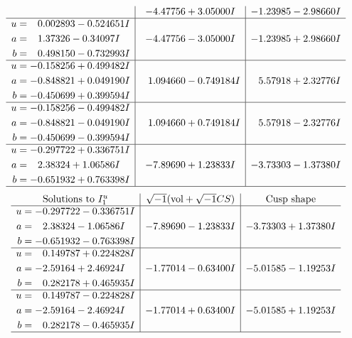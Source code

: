 \documentclass[1p]{elsarticle_modified}
\theoremstyle{definition}
\newcommand{\I}{\sqrt{-1}}
\begin{document}
$$\begin{array}{c|c|c}
 & -4.47756 + 3.05000 I & -1.23985 - 2.98660 I \\ \hline\begin{aligned}
u &= \phantom{-}0.002893 - 0.524651 I \\
a &= \phantom{-}1.37326 - 0.34097 I \\
b &= \phantom{-}0.498150 - 0.732993 I\end{aligned}
 & -4.47756 - 3.05000 I & -1.23985 + 2.98660 I \\ \hline\begin{aligned}
u &= -0.158256 + 0.499482 I \\
a &= -0.848821 + 0.049190 I \\
b &= -0.450699 + 0.399594 I\end{aligned}
 & \phantom{-}1.094660 - 0.749184 I & \phantom{-}5.57918 + 2.32776 I \\ \hline\begin{aligned}
u &= -0.158256 - 0.499482 I \\
a &= -0.848821 - 0.049190 I \\
b &= -0.450699 - 0.399594 I\end{aligned}
 & \phantom{-}1.094660 + 0.749184 I & \phantom{-}5.57918 - 2.32776 I \\ \hline\begin{aligned}
u &= -0.297722 + 0.336751 I \\
a &= \phantom{-}2.38324 + 1.06586 I \\
b &= -0.651932 + 0.763398 I\end{aligned}
 & -7.89690 + 1.23833 I & -3.73303 - 1.37380 I\\
 \hline 
 \end{array}$$\newpage$$\begin{array}{c|c|c}  
\text{Solutions to }I^u_{1}& \I (\text{vol} + \sqrt{-1}CS) & \text{Cusp shape}\\
 \hline 
\begin{aligned}
u &= -0.297722 - 0.336751 I \\
a &= \phantom{-}2.38324 - 1.06586 I \\
b &= -0.651932 - 0.763398 I\end{aligned}
 & -7.89690 - 1.23833 I & -3.73303 + 1.37380 I \\ \hline\begin{aligned}
u &= \phantom{-}0.149787 + 0.224828 I \\
a &= -2.59164 + 2.46924 I \\
b &= \phantom{-}0.282178 + 0.465935 I\end{aligned}
 & -1.77014 - 0.63400 I & -5.01585 - 1.19253 I \\ \hline\begin{aligned}
u &= \phantom{-}0.149787 - 0.224828 I \\
a &= -2.59164 - 2.46924 I \\
b &= \phantom{-}0.282178 - 0.465935 I\end{aligned}
 & -1.77014 + 0.63400 I & -5.01585 + 1.19253 I\\
 \hline 
 \end{array}$$\newpage
\end{document}
